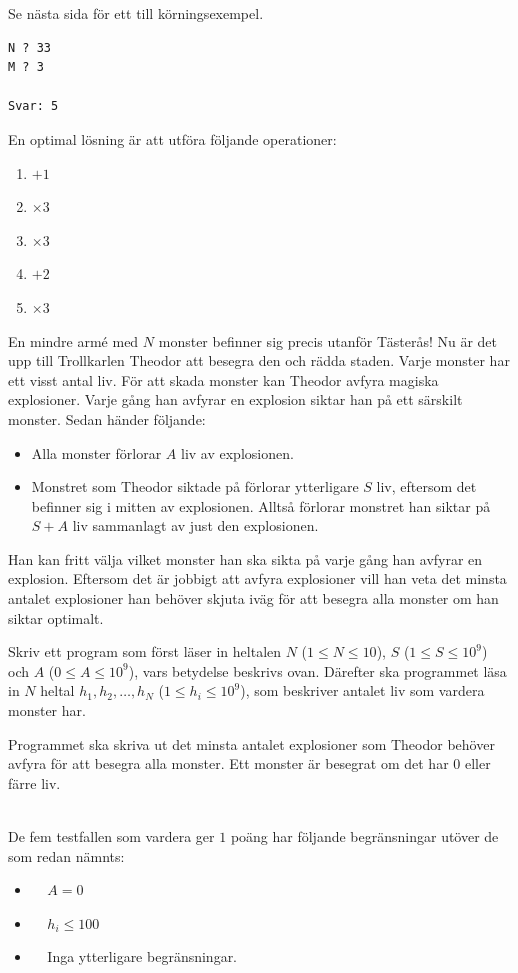 Se nästa sida för ett till körningsexempel.

\newpage

\begin{verbatim}
N ? 33
M ? 3

Svar: 5
\end{verbatim}
En optimal lösning är att utföra följande operationer:
\begin{enumerate}
  \item $+1$
  \item $\times 3$
  \item $\times 3$
  \item $+2$
  \item $\times 3$
\end{enumerate}


\newpage
{}

En mindre armé med $N$ monster befinner sig precis utanför Tästerås! Nu är det upp
till Trollkarlen Theodor att besegra den och rädda staden. Varje monster har ett visst
antal liv. För att skada monster kan
Theodor avfyra magiska explosioner. Varje gång han avfyrar en explosion siktar han på ett
särskilt monster. Sedan händer följande:
\begin{itemize}
  \item Alla monster förlorar $A$ liv av explosionen.
  \item Monstret som Theodor siktade på förlorar ytterligare $S$ liv, 
  eftersom det befinner sig i mitten av explosionen. Alltså förlorar monstret han siktar
  på $S+A$ liv sammanlagt av just den explosionen.
\end{itemize}
Han kan fritt välja vilket monster han ska sikta på varje gång han avfyrar en explosion.
Eftersom det är jobbigt att avfyra explosioner vill han veta det minsta antalet
explosioner han behöver skjuta iväg för att besegra alla monster om han siktar optimalt.

Skriv ett program som först läser in heltalen $N$ ($1 \leq N \leq 10$), $S$ ($1 \leq S \leq 10^9$) och $A$ ($0 \leq A \leq 10^9$), 
vars betydelse beskrivs ovan. Därefter ska programmet läsa in $N$ heltal $h_1, h_2, \ldots, h_N$ ($1 \leq h_i \leq 10^9$), som
beskriver antalet liv som vardera monster har.

Programmet ska skriva ut det minsta antalet explosioner som Theodor behöver avfyra för att besegra
alla monster. Ett monster är besegrat om det har 0 eller färre liv.

\\
De fem testfallen som vardera ger $1$ poäng har följande begränsningar utöver de som redan nämnts:
\begin{itemize}
    \item[(1)] $\;\;\;\; A=0$
    \item[(2-3)] $\;\;\;\; h_i \leq 100$
    \item[(4-5)] $\;\;\;\; $Inga ytterligare begränsningar.
\end{itemize}


